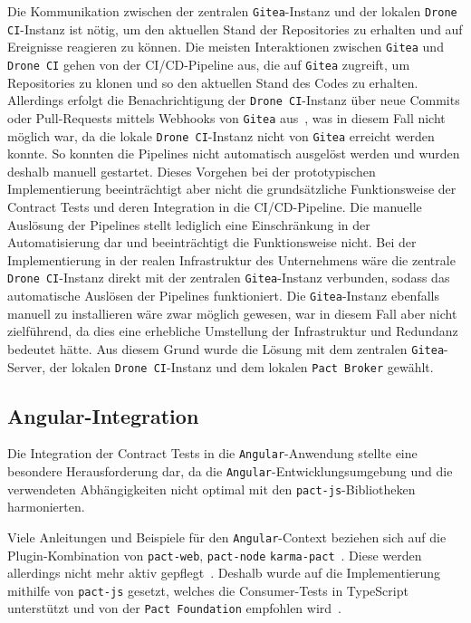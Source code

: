 Die Kommunikation zwischen der zentralen \texttt{Gitea}-Instanz und der lokalen \texttt{Drone CI}-Instanz ist nötig, um den aktuellen Stand der Repositories zu erhalten und auf Ereignisse reagieren zu können.
Die meisten Interaktionen zwischen \texttt{Gitea} und \texttt{Drone CI} gehen von der \gls{CI}/\gls{CD}-\gls{Pipeline} aus, die auf \texttt{Gitea} zugreift, um Repositories zu klonen und so den aktuellen Stand des Codes zu erhalten.
Allerdings erfolgt die Benachrichtigung der \texttt{Drone CI}-Instanz über neue Commits oder Pull-Requests mittels Webhooks von \texttt{Gitea} aus~\cite{DroneCICD}, was in diesem Fall nicht möglich war, da die lokale \texttt{Drone CI}-Instanz nicht von \texttt{Gitea} erreicht werden konnte.
So konnten die \glspl{Pipeline} nicht automatisch ausgelöst werden und wurden deshalb manuell gestartet.
Dieses Vorgehen bei der prototypischen Implementierung beeinträchtigt aber nicht die grundsätzliche Funktionsweise der Contract Tests und deren Integration in die \gls{CI}/\gls{CD}-\gls{Pipeline}.
Die manuelle Auslösung der \glspl{Pipeline} stellt lediglich eine Einschränkung in der Automatisierung dar und beeinträchtigt die Funktionsweise nicht.
Bei der Implementierung in der realen Infrastruktur des Unternehmens wäre die zentrale \texttt{Drone CI}-Instanz direkt mit der zentralen \texttt{Gitea}-Instanz verbunden, sodass das automatische Auslösen der \glspl{Pipeline} funktioniert.
Die \texttt{Gitea}-Instanz ebenfalls manuell zu installieren wäre zwar möglich gewesen, war in diesem Fall aber nicht zielführend, da dies eine erhebliche Umstellung der Infrastruktur und Redundanz bedeutet hätte.
Aus diesem Grund wurde die Lösung mit dem zentralen \texttt{Gitea}-Server, der lokalen \texttt{Drone CI}-Instanz und dem lokalen \texttt{Pact Broker} gewählt.

\subsection{Angular-Integration}\label{subsec:implementation_problems_angular-integration}

Die Integration der Contract Tests in die \texttt{\gls{Angular}}-Anwendung stellte eine besondere Herausforderung dar, da die \texttt{\gls{Angular}}-Entwicklungsumgebung und die verwendeten Abhängigkeiten nicht optimal mit den \texttt{pact-js}-Bibliotheken harmonierten.

Viele Anleitungen und Beispiele für den \texttt{Angular}-Context beziehen sich auf die Plugin-Kombination von \texttt{pact-web}, \texttt{pact-node} \bzw \texttt{karma-pact}~\cite{hendricksenConsumerDrivenContractTesting2020, hombergsCreatingConsumerDrivenContract2017}.
Diese werden allerdings nicht mehr aktiv gepflegt~\cite{PactfoundationPactweb2022, PactfoundationKarmapactPact}.
Deshalb wurde auf die Implementierung mithilfe von \texttt{pact-js} gesetzt, welches die Consumer-Tests in TypeScript unterstützt und von der \texttt{Pact Foundation} empfohlen wird~\cite{pactfoundationPactDocs2022}.

